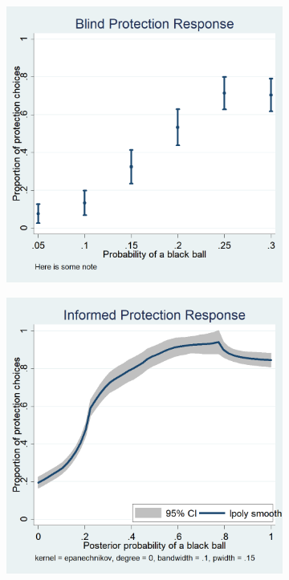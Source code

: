 \begin{figure}[H]
\centering
\caption{Average Protection Response} \label{fig:ProtResponse}
\begin{subfigure}[t]{.45\textwidth}
  \centering
\includegraphics[width=\textwidth]{Graphs/blind_prot_sta.png}
\end{subfigure}
\begin{subfigure}[t]{.45\textwidth}
  \includegraphics[width=\textwidth]{Graphs/ip_response_lpoly.png}
\end{subfigure}
%
\end{figure}
